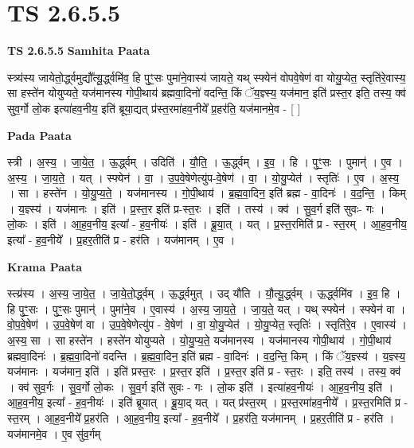 \documentclass[17pt]{extarticle}
\begin{document}
\section*{ TS 2.6.5.5 }

\textbf{TS 2.6.5.5 } \newline
\textbf{Samhita Paata} \newline

स्त्र्य॑स्य जायेतो॒र्द्ध्वमुद्यौ᳚त्यू॒र्द्ध्वमि॑व॒ हि पुꣳ॒॒सः पुमा॑ने॒वास्य॑ जायते॒ यथ् स्फ्येन॑ वोपवे॒षेण॑ वा योयु॒प्येत॒ स्तृति॑रे॒वास्य॒ सा हस्ते॑न योयुप्यते॒ यज॑मानस्य गोपी॒थाय॑ ब्रह्मवा॒दिनो॑ वदन्ति॒ किं ॅय॒ज्ञ्स्य॒ यज॑मान॒ इति॑ प्रस्त॒र इति॒ तस्य॒ क्व॑ सुव॒र्गो लो॒क इत्या॑हव॒नीय॒ इति॑ ब्रूया॒द्यत् प्र॑स्त॒रमा॑हव॒नीये᳚ प्र॒हर॑ति॒ यज॑मानमे॒व - [  ] \newline

\textbf{Pada Paata} \newline

स्त्री । अ॒स्य॒ । जा॒ये॒त॒ । ऊ॒र्द्ध्वम् । उदिति॑ । यौ॒ति॒ । ऊ॒र्द्ध्वम् । इ॒व॒ । हि । पुꣳ॒॒सः । पुमान्॑ । ए॒व । अ॒स्य॒ । जा॒य॒ते॒ । यत् । स्फ्येन॑ । वा॒ । उ॒प॒वे॒षेणेत्यु॑प-वे॒षेण॑ । वा॒ । यो॒यु॒प्येत॑ । स्तृतिः॑ । ए॒व । अ॒स्य॒ । सा । हस्ते॑न । यो॒यु॒प्य॒ते॒ । यज॑मानस्य । गो॒पी॒थाय॑ । ब्र॒ह्म॒वा॒दिन॒ इति॑ ब्रह्म - वा॒दिनः॑ । व॒द॒न्ति॒ । किम् । य॒ज्ञ्स्य॑ । यज॑मानः । इति॑ । प्र॒स्त॒र इति॑ प्र-स्त॒रः । इति॑ । तस्य॑ । क्व॑ । सु॒व॒र्ग इति॑ सुवः- गः । लो॒कः । इति॑ । आ॒ह॒व॒नीय॒ इत्या᳚ - ह॒व॒नीयः॑ । इति॑ । ब्रू॒या॒त् । यत् । प्र॒स्त॒रमिति॑ प्र - स्त॒रम् । आ॒ह॒व॒नीय॒ इत्या᳚ - ह॒व॒नीये᳚ । प्र॒हर॒तीति॑ प्र - हर॑ति । यज॑मानम् । ए॒व ।  \newline


\textbf{Krama Paata} \newline

स्त्य्र॑स्य । अ॒स्य॒ जा॒ये॒त॒ । जा॒ये॒तो॒र्द्ध्वम् । ऊ॒र्द्ध्वमुत् । उद् यौ॑ति । यौ॒त्यू॒र्द्ध्वम् । ऊ॒र्द्ध्वमि॑व । इ॒व॒ हि । हि पुꣳ॒॒सः । पुꣳ॒॒सः पुमान्॑ । पुमा॑ने॒व । ए॒वास्य॑ । अ॒स्य॒ जा॒य॒ते॒ । जा॒य॒ते॒ यत् । यथ् स्फ्येन॑ । स्फ्येन॑ वा । वो॒प॒वे॒षेण॑ । उ॒प॒वे॒षेण॑ वा । उ॒प॒वे॒षेणेत्यु॑प - वे॒षेण॑ । वा॒ यो॒यु॒प्येत॑ । यो॒यु॒प्येत॒ स्तृतिः॑ । स्तृति॑रे॒व । ए॒वास्य॑ । अ॒स्य॒ सा । सा हस्ते॑न । हस्ते॑न योयुप्यते । यो॒यु॒प्य॒ते॒ यज॑मानस्य । यज॑मानस्य गोपी॒थाय॑ । गो॒पी॒थाय॑ ब्रह्मवा॒दिनः॑ । ब्र॒ह्म॒वा॒दिनो॑ वदन्ति । ब्र॒ह्म॒वा॒दिन॒ इति॑ ब्रह्म - वा॒दिनः॑ । व॒द॒न्ति॒ किम् । किं ॅय॒ज्ञ्स्य॑ । य॒ज्ञ्स्य॒ यज॑मानः । यज॑मान॒ इति॑ । इति॑ प्रस्त॒रः । प्र॒स्त॒र इति॑ । प्र॒स्त॒र इति॑ प्र - स्त॒रः । इति॒ तस्य॑ । तस्य॒ क्व॑ । क्व॑ सुव॒र्गः । सु॒व॒र्गो लो॒कः । सु॒व॒र्ग इति॑ सुवः - गः । लो॒क इति॑ । इत्या॑हव॒नीयः॑ । आ॒ह॒व॒नीय॒ इति॑ । आ॒ह॒व॒नीय॒ इत्या᳚ - ह॒व॒नीयः॑ । इति॑ ब्रूयात् । ब्रू॒या॒द् यत् । यत् प्र॑स्त॒रम् । प्र॒स्त॒रमा॑हव॒नीये᳚ । प्र॒स्त॒रमिति॑ प्र - स्त॒रम् । आ॒ह॒व॒नीये᳚ प्र॒हर॑ति । आ॒ह॒व॒नीय॒ इत्या᳚ - ह॒व॒नीये᳚ । प्र॒हर॑ति॒ यज॑मानम् । प्र॒हर॒तीति॑ प्र - हर॑ति । यज॑मानमे॒व । ए॒व सु॑व॒र्गम् \newline
\end{document}

